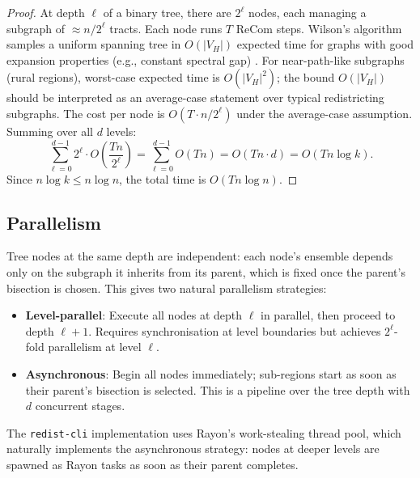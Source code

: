\begin{proof}
  At depth $\ell$ of a binary tree, there are $2^\ell$ nodes, each managing a
  subgraph of $\approx n / 2^\ell$ tracts. Each node runs $T$ ReCom steps.
  Wilson's algorithm samples a uniform spanning tree in $O(|V_H|)$ expected
  time for graphs with good expansion properties (e.g., constant spectral gap)
  \citep{wilson1996generating}. For near-path-like subgraphs (rural regions),
  worst-case expected time is $O(|V_H|^2)$; the bound $O(|V_H|)$ should be
  interpreted as an average-case statement over typical redistricting subgraphs.
  The cost per node is $O(T \cdot n / 2^\ell)$ under the average-case assumption.
  Summing over all $d$ levels:
  \[
    \sum_{\ell=0}^{d-1} 2^\ell \cdot O\!\left(\frac{Tn}{2^\ell}\right)
    = \sum_{\ell=0}^{d-1} O(Tn)
    = O(Tn \cdot d)
    = O(Tn \log k).
  \]
  Since $n \log k \leq n \log n$, the total time is $O(T n \log n)$.
\end{proof}

\subsection{Parallelism}
\label{sec:alg:parallel}

Tree nodes at the same depth are independent: each node's ensemble depends
only on the subgraph it inherits from its parent, which is fixed once the
parent's bisection is chosen. This gives two natural parallelism strategies:
\begin{itemize}
  \item \textbf{Level-parallel}: Execute all nodes at depth $\ell$ in parallel,
        then proceed to depth $\ell + 1$. Requires synchronisation at level
        boundaries but achieves $2^\ell$-fold parallelism at level $\ell$.
  \item \textbf{Asynchronous}: Begin all nodes immediately; sub-regions start
        as soon as their parent's bisection is selected. This is a pipeline
        over the tree depth with $d$ concurrent stages.
\end{itemize}
The \texttt{redist-cli} implementation uses Rayon's work-stealing thread pool,
which naturally implements the asynchronous strategy: nodes at deeper levels
are spawned as Rayon tasks as soon as their parent completes.
